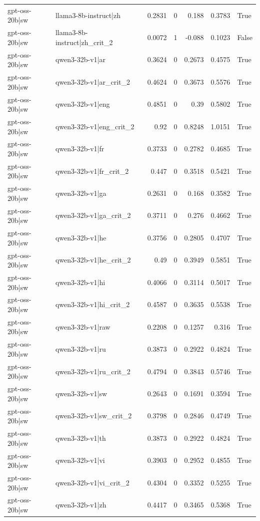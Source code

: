 \begin{table}
\begin{tabular}{l l r r r r l}
gpt-oss-20b|sw & llama3-8b-instruct|zh & 0.2831 & 0 & 0.188 & 0.3783 & True \\
gpt-oss-20b|sw & llama3-8b-instruct|zh_crit_2 & 0.0072 & 1 & -0.088 & 0.1023 & False \\
gpt-oss-20b|sw & qwen3-32b-v1|ar & 0.3624 & 0 & 0.2673 & 0.4575 & True \\
gpt-oss-20b|sw & qwen3-32b-v1|ar_crit_2 & 0.4624 & 0 & 0.3673 & 0.5576 & True \\
gpt-oss-20b|sw & qwen3-32b-v1|eng & 0.4851 & 0 & 0.39 & 0.5802 & True \\
gpt-oss-20b|sw & qwen3-32b-v1|eng_crit_2 & 0.92 & 0 & 0.8248 & 1.0151 & True \\
gpt-oss-20b|sw & qwen3-32b-v1|fr & 0.3733 & 0 & 0.2782 & 0.4685 & True \\
gpt-oss-20b|sw & qwen3-32b-v1|fr_crit_2 & 0.447 & 0 & 0.3518 & 0.5421 & True \\
gpt-oss-20b|sw & qwen3-32b-v1|ga & 0.2631 & 0 & 0.168 & 0.3582 & True \\
gpt-oss-20b|sw & qwen3-32b-v1|ga_crit_2 & 0.3711 & 0 & 0.276 & 0.4662 & True \\
gpt-oss-20b|sw & qwen3-32b-v1|he & 0.3756 & 0 & 0.2805 & 0.4707 & True \\
gpt-oss-20b|sw & qwen3-32b-v1|he_crit_2 & 0.49 & 0 & 0.3949 & 0.5851 & True \\
gpt-oss-20b|sw & qwen3-32b-v1|hi & 0.4066 & 0 & 0.3114 & 0.5017 & True \\
gpt-oss-20b|sw & qwen3-32b-v1|hi_crit_2 & 0.4587 & 0 & 0.3635 & 0.5538 & True \\
gpt-oss-20b|sw & qwen3-32b-v1|raw & 0.2208 & 0 & 0.1257 & 0.316 & True \\
gpt-oss-20b|sw & qwen3-32b-v1|ru & 0.3873 & 0 & 0.2922 & 0.4824 & True \\
gpt-oss-20b|sw & qwen3-32b-v1|ru_crit_2 & 0.4794 & 0 & 0.3843 & 0.5746 & True \\
gpt-oss-20b|sw & qwen3-32b-v1|sw & 0.2643 & 0 & 0.1691 & 0.3594 & True \\
gpt-oss-20b|sw & qwen3-32b-v1|sw_crit_2 & 0.3798 & 0 & 0.2846 & 0.4749 & True \\
gpt-oss-20b|sw & qwen3-32b-v1|th & 0.3873 & 0 & 0.2922 & 0.4824 & True \\
gpt-oss-20b|sw & qwen3-32b-v1|vi & 0.3903 & 0 & 0.2952 & 0.4855 & True \\
gpt-oss-20b|sw & qwen3-32b-v1|vi_crit_2 & 0.4304 & 0 & 0.3352 & 0.5255 & True \\
gpt-oss-20b|sw & qwen3-32b-v1|zh & 0.4417 & 0 & 0.3465 & 0.5368 & True \\

\end{tabular}
\end{table}
